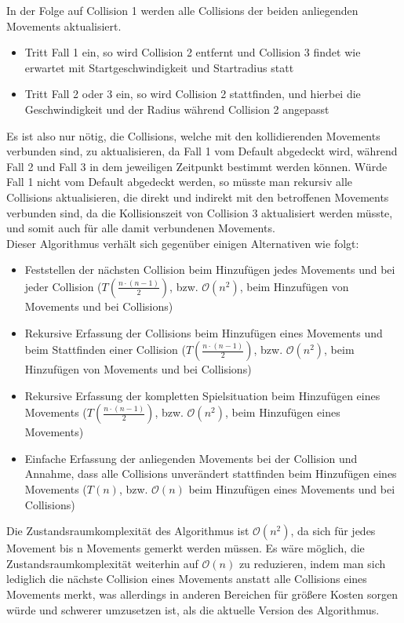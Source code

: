 In der Folge auf Collision 1 werden alle Collisions der beiden anliegenden Movements aktualisiert. \\
\begin{itemize}
	\item Tritt Fall 1 ein, so wird Collision 2 entfernt und Collision 3 findet wie erwartet mit Startgeschwindigkeit und Startradius statt
	\item Tritt Fall 2 oder 3 ein, so wird Collision 2 stattfinden, und hierbei die Geschwindigkeit und der Radius während Collision 2 angepasst
\end{itemize}
Es ist also nur nötig, die Collisions, welche mit den kollidierenden Movements verbunden sind, zu aktualisieren, da Fall 1 vom Default abgedeckt wird, während Fall 2 und Fall 3 in dem jeweiligen Zeitpunkt bestimmt werden können. Würde Fall 1 nicht vom Default abgedeckt werden, so müsste man rekursiv alle Collisions aktualisieren, die direkt und indirekt mit den betroffenen Movements verbunden sind, da die Kollisionszeit von Collision 3 aktualisiert werden müsste, und somit auch für alle damit verbundenen Movements. \\

Dieser Algorithmus verhält sich gegenüber einigen Alternativen wie folgt:
\begin{itemize}
	\item Feststellen der nächsten Collision beim Hinzufügen jedes Movements und bei jeder Collision 
	($T(\frac{n \cdot (n - 1)}{2})$, bzw. $\mathcal{O}(n^2)$, beim Hinzufügen von Movements und bei Collisions)
	\item Rekursive Erfassung der Collisions beim Hinzufügen eines Movements und beim Stattfinden einer Collision 
	($T(\frac{n \cdot (n - 1)}{2})$, bzw. $\mathcal{O}(n^2)$, beim Hinzufügen von Movements und bei Collisions)
	\item Rekursive Erfassung der kompletten Spielsituation beim Hinzufügen eines Movements 
	($T(\frac{n \cdot (n - 1)}{2})$, bzw. $\mathcal{O}(n^2)$, beim Hinzufügen eines Movements)
	\item Einfache Erfassung der anliegenden Movements bei der Collision und Annahme, dass alle Collisions unverändert stattfinden beim Hinzufügen eines Movements 
	($T(n)$, bzw.  $\mathcal{O}(n)$ beim Hinzufügen eines Movements und bei Collisions)
\end{itemize}
Die Zustandsraumkomplexität des Algorithmus ist $\mathcal{O}(n^2)$, da sich für jedes Movement bis n Movements gemerkt werden müssen.
Es wäre möglich, die Zustandsraumkomplexität weiterhin auf $\mathcal{O}(n)$ zu reduzieren, indem man sich lediglich die nächste Collision eines Movements anstatt alle Collisions eines Movements merkt, was allerdings in anderen Bereichen für größere Kosten sorgen würde und schwerer umzusetzen ist, als die aktuelle Version des Algorithmus.

